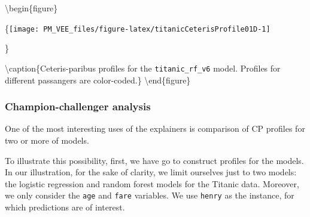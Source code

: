 \documentclass[12pt,]{krantz}
\newenvironment{Shaded}{\begin{snugshade}}{\end{snugshade}}
\newcommand{\DataTypeTok}[1]{\textcolor[rgb]{0.13,0.29,0.53}{#1}}
\newcommand{\DecValTok}[1]{\textcolor[rgb]{0.00,0.00,0.81}{#1}}
\newcommand{\KeywordTok}[1]{\textcolor[rgb]{0.13,0.29,0.53}{\textbf{#1}}}
\newcommand{\NormalTok}[1]{#1}
\newcommand{\OperatorTok}[1]{\textcolor[rgb]{0.81,0.36,0.00}{\textbf{#1}}}
\newcommand{\StringTok}[1]{\textcolor[rgb]{0.31,0.60,0.02}{#1}}
\theoremstyle{definition}
\theoremstyle{definition}
\theoremstyle{definition}
\theoremstyle{remark}
\begin{document}
\begin{Shaded}
\end{Shaded}

\textbackslash{}begin\{figure\}

\{\centering \texttt{[image: PM\_VEE\_files/figure-latex/titanicCeterisProfile01D-1]}

\}

\textbackslash{}caption\{Ceteris-paribus profiles for the
\texttt{titanic\_rf\_v6} model. Profiles for different passangers are
color-coded.\}\label{fig:titanicCeterisProfile01D}
\textbackslash{}end\{figure\}

\hypertarget{champion-challenger-analysis}{%
\subsubsection{Champion-challenger
analysis}\label{champion-challenger-analysis}}

One of the most interesting uses of the explainers is comparison of CP
profiles for two or more of models.

To illustrate this possibility, first, we have go to construct profiles
for the models. In our illustration, for the sake of clarity, we limit
ourselves just to two models: the logistic regression and random forest
models for the Titanic data. Moreover, we only consider the \texttt{age}
and \texttt{fare} variables. We use \texttt{henry} as the instance, for
which predictions are of interest.
\end{document}
